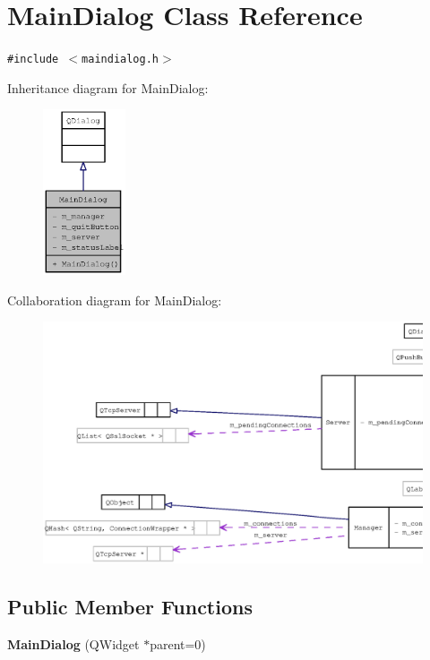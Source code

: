 \section{MainDialog Class Reference}
\label{classMainDialog}
{\tt \#include $<$maindialog.h$>$}

Inheritance diagram for MainDialog:\nopagebreak
\begin{figure}[H]
\begin{center}
\leavevmode
\includegraphics[width=69pt]{classMainDialog__inherit__graph}
\end{center}
\end{figure}
Collaboration diagram for MainDialog:\nopagebreak
\begin{figure}[H]
\begin{center}
\leavevmode
\includegraphics[width=400pt]{classMainDialog__coll__graph}
\end{center}
\end{figure}
\subsection*{Public Member Functions}
\begin{CompactItemize}
\item 
{\bf MainDialog} (QWidget $\ast$parent=0)
\end{CompactItemize}
